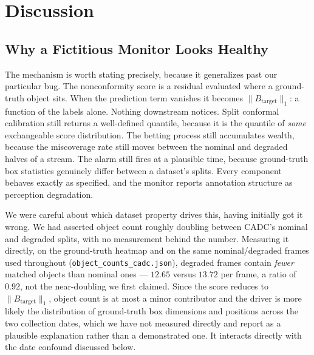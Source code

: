 \section{Discussion}
\label{sec:discussion}

\subsection{Why a Fictitious Monitor Looks Healthy}
\label{sec:discuss-null}

The mechanism is worth stating precisely, because it generalizes past our
particular bug. The nonconformity score is a residual evaluated where a
ground-truth object sits. When the prediction term vanishes it becomes
$\lVert B_{\mathrm{target}} \rVert_1$: a function of the labels alone.
Nothing downstream notices. Split conformal calibration still returns a
well-defined quantile, because it is the quantile of \emph{some}
exchangeable score distribution. The betting process still accumulates
wealth, because the miscoverage rate still moves between the nominal and
degraded halves of a stream. The alarm still fires at a plausible time,
because ground-truth box statistics genuinely differ between a dataset's
splits. Every component behaves exactly as specified, and the monitor
reports annotation structure as perception degradation.

We were careful about which dataset property drives this, having initially
got it wrong. We had asserted object count roughly doubling between CADC's
nominal and degraded splits, with no measurement behind the number.
Measuring it directly, on the ground-truth heatmap and on the same
nominal/degraded frames used throughout (\texttt{object\_counts\_cadc.json}),
degraded frames contain \emph{fewer} matched objects than nominal ones ---
$12.65$ versus $13.72$ per frame, a ratio of $0.92$, not the near-doubling we
first claimed. Since the score reduces to $\lVert B_{\mathrm{target}}
\rVert_1$, object count is at most a minor contributor and the driver is
more likely the distribution of ground-truth box dimensions and positions
across the two collection dates, which we have not measured directly and
report as a plausible explanation rather than a demonstrated one. It
interacts directly with the date confound discussed below.

